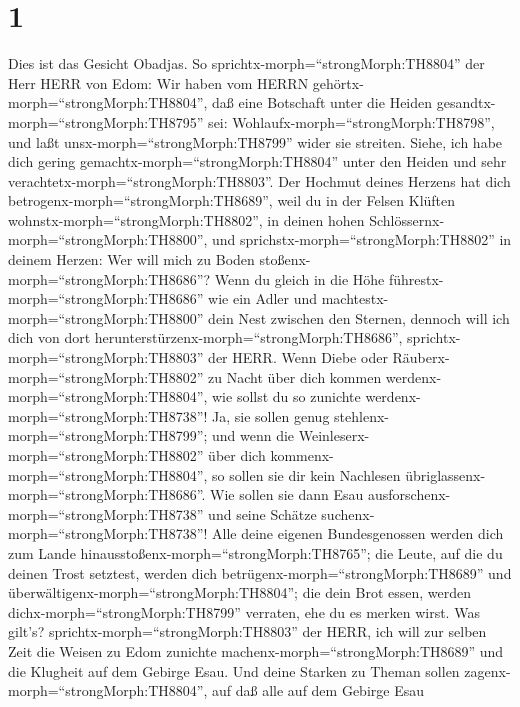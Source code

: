 \hypertarget{section}{%
\section{1}\label{section}}

 Dies ist das Gesicht Obadjas. So
sprichtx-morph=``strongMorph:TH8804'' der Herr HERR von Edom: Wir haben
vom HERRN gehörtx-morph=``strongMorph:TH8804'', daß eine Botschaft unter
die Heiden gesandtx-morph=``strongMorph:TH8795'' sei:
Wohlaufx-morph=``strongMorph:TH8798'', und laßt
unsx-morph=``strongMorph:TH8799'' wider sie streiten. 
Siehe, ich habe dich gering gemachtx-morph=``strongMorph:TH8804'' unter
den Heiden und sehr verachtetx-morph=``strongMorph:TH8803''.
 Der Hochmut deines Herzens hat dich
betrogenx-morph=``strongMorph:TH8689'', weil du in der Felsen Klüften
wohnstx-morph=``strongMorph:TH8802'', in deinen hohen
Schlössernx-morph=``strongMorph:TH8800'', und
sprichstx-morph=``strongMorph:TH8802'' in deinem Herzen: Wer will mich
zu Boden stoßenx-morph=``strongMorph:TH8686''?  Wenn du
gleich in die Höhe führestx-morph=``strongMorph:TH8686'' wie ein Adler
und machtestx-morph=``strongMorph:TH8800'' dein Nest zwischen den
Sternen, dennoch will ich dich von dort
herunterstürzenx-morph=``strongMorph:TH8686'',
sprichtx-morph=``strongMorph:TH8803'' der HERR.  Wenn Diebe
oder Räuberx-morph=``strongMorph:TH8802'' zu Nacht über dich kommen
werdenx-morph=``strongMorph:TH8804'', wie sollst du so zunichte
werdenx-morph=``strongMorph:TH8738''! Ja, sie sollen genug
stehlenx-morph=``strongMorph:TH8799''; und wenn die
Weinleserx-morph=``strongMorph:TH8802'' über dich
kommenx-morph=``strongMorph:TH8804'', so sollen sie dir kein Nachlesen
übriglassenx-morph=``strongMorph:TH8686''.  Wie sollen sie
dann Esau ausforschenx-morph=``strongMorph:TH8738'' und seine Schätze
suchenx-morph=``strongMorph:TH8738''!  Alle deine eigenen
Bundesgenossen werden dich zum Lande
hinausstoßenx-morph=``strongMorph:TH8765''; die Leute, auf die du deinen
Trost setztest, werden dich betrügenx-morph=``strongMorph:TH8689'' und
überwältigenx-morph=``strongMorph:TH8804''; die dein Brot essen, werden
dichx-morph=``strongMorph:TH8799'' verraten, ehe du es merken wirst.
 Was gilt's? sprichtx-morph=``strongMorph:TH8803'' der HERR,
ich will zur selben Zeit die Weisen zu Edom zunichte
machenx-morph=``strongMorph:TH8689'' und die Klugheit auf dem Gebirge
Esau.  Und deine Starken zu Theman sollen
zagenx-morph=``strongMorph:TH8804'', auf daß alle auf dem Gebirge Esau
